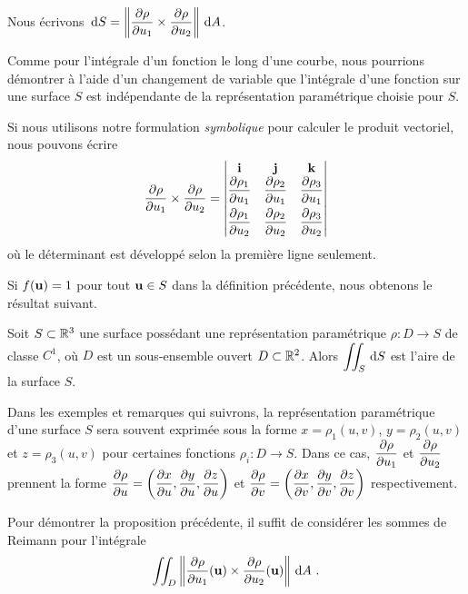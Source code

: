 {\begin{defn}
Nous écrivons
$\displaystyle \,\mathrm{d}S =
\left\| \frac{\partial \rho}{\partial u_1} \times \frac{\partial \rho}{\partial u_2} \right\|
\,\mathrm{d}A$.
\end{defn}

\begin{rmk}
Comme pour l'intégrale d'un fonction le long d'une courbe, nous
pourrions démontrer à l'aide d'un changement de variable
que l'intégrale d'une fonction sur une surface $S$ est
indépendante de la représentation paramétrique choisie pour $S$.
\end{rmk}

\begin{rmk}
Si nous utilisons notre formulation {\em symbolique} pour calculer le produit
vectoriel, nous pouvons écrire
\[
\frac{\partial \rho}{\partial u_1} \times \frac{\partial \rho}{\partial u_2}
= \begin{vmatrix}
\mathbf{i} & \mathbf{j} & \mathbf{k} \\
\displaystyle \frac{\partial \rho_1}{\partial u_1} & \displaystyle \frac{\partial \rho_2}{\partial u_1} &
\displaystyle \frac{\partial \rho_3}{\partial u_1} \\[0.8em]
\displaystyle \frac{\partial \rho_1}{\partial u_2} & \displaystyle \frac{\partial \rho_2}{\partial u_2} &
\displaystyle \frac{\partial \rho_3}{\partial u_2} \end{vmatrix}
\]
où le déterminant est développé selon la première ligne seulement.
\end{rmk}

Si $f(\mathbf{u}) = 1$ pour tout $\mathbf{u} \in S$ dans la définition
précédente, nous obtenons le résultat suivant.

\begin{prop}
Soit $S \subset \mathbb{R}^3$ une surface possédant une représentation
paramétrique $\rho:D\rightarrow S$ de classe $C^1$, où $D$ est un
sous-ensemble ouvert $D \subset \mathbb{R}^2$.  Alors
$\displaystyle \iint_S \,\mathrm{d}S$ est l'aire de la surface $S$.
\end{prop}

\begin{rmk}
Dans les exemples et remarques qui suivrons, la
représentation paramétrique d'une surface $S$ sera souvent exprimée
sous la forme $x = \rho_1(u,v)$, $y=\rho_2(u,v)$ et $z = \rho_3(u,v)$ 
pour certaines fonctions $\rho_i:D\to S$.  Dans ce cas,
$\displaystyle \frac{\partial \rho}{\partial u_1}$
et $\displaystyle \frac{\partial \rho}{\partial u_2}$ prennent la forme
$\displaystyle \frac{\partial \rho}{\partial u}
= \left( \frac{\partial x}{\partial u} , \frac{\partial y}{\partial u} , \frac{\partial z}{\partial u} \right)$
et
$\displaystyle
\frac{\partial \rho}{\partial v} = \left( \frac{\partial x}{\partial v} , \frac{\partial y}{\partial v} , \frac{\partial z}{\partial v} \right)$
respectivement.
\end{rmk}

\begin{rmk}[\theory]
Pour démontrer la proposition précédente, il suffit de considérer les
sommes de Reimann pour l'intégrale
\[
\iint_D \left\|\frac{\partial \rho}{\partial u_1}(\mathbf{u}) \times
\frac{\partial \rho}{\partial u_2}(\mathbf{u})\right\| \,\mathrm{d}A \ .
\]


\end{rmk}}
